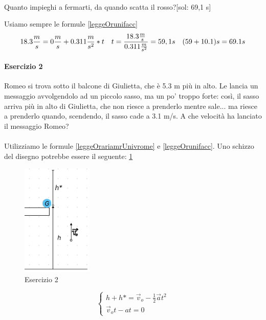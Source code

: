 \paragraph{}
Quanto impieghi a fermarti, da quando scatta il rosso?[sol: 69,1 s]

Usiamo sempre le formule \ref{leggeOrunifacc}
\begin{equation*}
    18.3\frac{m}{s}=0\frac{m}{s}+0.311\frac{m}{s^2}*t \quad t =\frac{18.3\frac{m}{s}}{0.311\frac{m}{s^2}} = 59,1 s \quad (59+10.1)s = 69.1s
\end{equation*}

\paragraph{Esercizio 2}
Romeo si trova sotto il balcone di Giulietta, che è 5.3 m più in alto. Le lancia un messaggio avvolgendolo ad un piccolo sasso, ma un po' troppo forte: così, il sasso arriva più in alto di Giulietta, che non riesce a prenderlo mentre sale... ma riesce a prenderlo quando, scendendo, il sasso cade a 3.1 m/s. A che velocità ha lanciato il messaggio Romeo?

\paragraph{}
Utilizziamo le formule \ref{leggeOrariamrUnivrome} e \ref{leggeOrunifacc}. Uno schizzo del disegno potrebbe essere il seguente: \ref{img:giulietta}

\begin{figure}[tb]
\centering
\includegraphics[width=0.30\textwidth]{image/giulietta}
\caption{Esercizio 2}
\label{img:giulietta}
\end{figure}

$$
\begin{cases}
    h + h* = \vec{v}_o - \frac{1}{2}\vec{a}t^2\\
    \vec{v}_ot - at = 0
\end{cases}
$$

